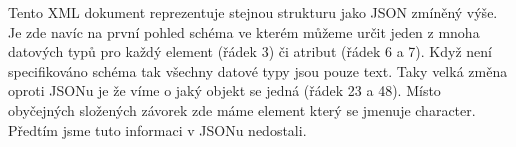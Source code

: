 Tento XML dokument reprezentuje stejnou strukturu jako JSON zmíněný výše. Je zde navíc na první pohled schéma ve kterém můžeme určit jeden z mnoha datových typů pro každý element (řádek 3) či atribut (řádek 6 a 7). Když není specifikováno schéma tak všechny datové typy jsou pouze text. Taky velká změna oproti JSONu je že víme o jaký objekt se jedná (řádek 23 a 48). Místo obyčejných složených závorek zde máme element který se jmenuje character. Předtím jsme tuto informaci v JSONu nedostali.



\endinput
